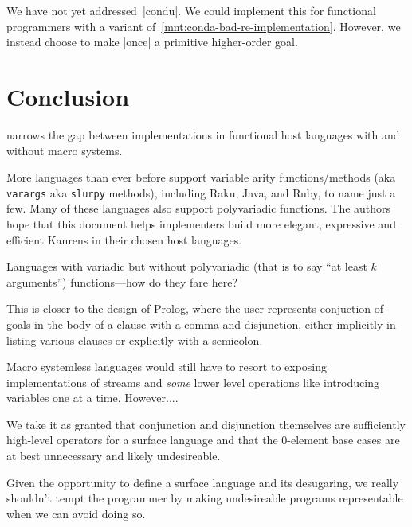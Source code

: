 \documentclass[sigplan,screen,draft,anonymous,review,natbib=false]{acmart}
\begin{document}
We have not yet addressed~\rackinline|condu|. We could implement this
for functional programmers with a variant
of~\cref{mnt:conda-bad-re-implementation}. However, we instead choose
to make \rackinline|once| a primitive higher-order goal.


\section{Conclusion}\label{sec:conclusion}

narrows the gap between implementations in functional host languages
with and without macro systems.

More languages than ever before support variable arity
functions/methods (aka \verb|varargs| aka \verb|slurpy| methods),
including Raku, Java, and Ruby, to name just a few. Many of these
languages also support polyvariadic functions. The authors hope that
this document helps implementers build more elegant, expressive and
efficient Kanrens in their chosen host languages.

Languages with variadic but without polyvariadic (that is to say
\enquote{at least $k$ arguments}) functions---how do they fare here?

This is closer to the design of Prolog,
where the user represents conjuction of goals in the body of a clause
with a comma and disjunction, either implicitly in listing various
clauses or explicitly with a semicolon.

Macro systemless languages would still have to resort to exposing
implementations of streams and \emph{some} lower level operations like
introducing variables one at a time. However....

We take it as granted that conjunction and disjunction themselves are
sufficiently high-level operators for a surface language and that the
0-element base cases are at best unnecessary and likely undesireable.

Given the opportunity to define a surface language and its desugaring,
we really shouldn't tempt the programmer by making undesireable
programs representable when we can avoid doing so.
\end{document}
